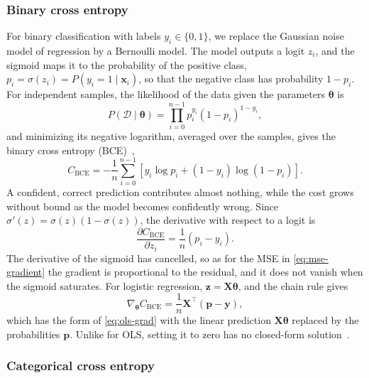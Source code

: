 \subsubsection{Binary cross entropy}

For binary classification with labels $y_i \in \{0, 1\}$, we replace the Gaussian noise
model of regression by a Bernoulli model. The model outputs a logit $z_i$, and the sigmoid
maps it to the probability of the positive class, $p_i = \sigma(z_i) = P(y_i = 1 \mid
\bm{x}_i)$, so that the negative class has probability $1 - p_i$. For independent samples,
the likelihood of the data given the parameters $\bm{\theta}$ is
\begin{equation}\label{eq:bernoulli-likelihood}
    P(\mathcal{D} \mid \bm{\theta}) = \prod_{i=0}^{n-1} p_i^{y_i}(1 - p_i)^{1 - y_i},
\end{equation}
and minimizing its negative logarithm, averaged over the samples, gives the binary cross
entropy (BCE)~\cite{goodfellow_2016,hjorth-jensen_2026},
\begin{equation}\label{eq:bce-cost}
    C_\text{BCE} = -\frac{1}{n}\sum_{i=0}^{n-1}
    \left[y_i \log p_i + (1 - y_i)\log(1 - p_i)\right].
\end{equation}
A confident, correct prediction contributes almost nothing, while the cost grows without
bound as the model becomes confidently wrong. Since $\sigma'(z) = \sigma(z)(1 - \sigma(z))$,
the derivative with respect to a logit is
\begin{equation}\label{eq:bce-gradient}
    \frac{\partial C_\text{BCE}}{\partial z_i} = \frac{1}{n}\left(p_i - y_i\right).
\end{equation}
The derivative of the sigmoid has cancelled, so as for the MSE in \cref{eq:mse-gradient}
the gradient is proportional to the residual, and it does not vanish when the sigmoid
saturates. For logistic regression, $\bm{z} = \bm{X}\bm{\theta}$, and the chain rule gives
\begin{equation}\label{eq:bce-grad-theta}
    \nabla_{\bm{\theta}} C_\text{BCE} = \frac{1}{n}\bm{X}^\top(\bm{p} - \bm{y}),
\end{equation}
which has the form of \cref{eq:ols-grad} with the linear prediction $\bm{X}\bm{\theta}$
replaced by the probabilities $\bm{p}$. Unlike for OLS, setting it to zero has no
closed-form solution~\cite{hjorth-jensen_2026}.

\subsubsection{Categorical cross entropy}

